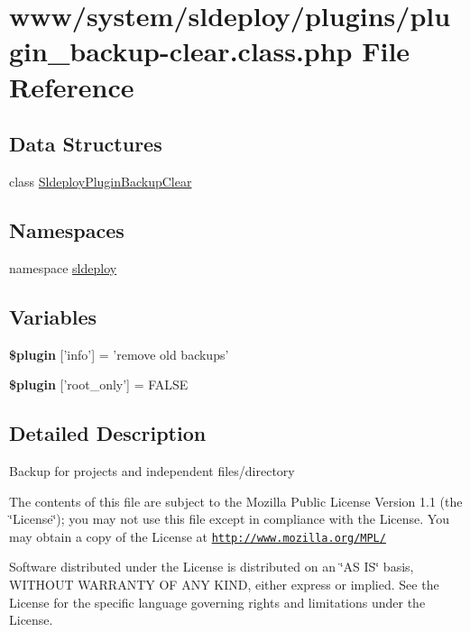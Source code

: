 \hypertarget{plugin__backup-clear_8class_8php}{
\section{www/system/sldeploy/plugins/plugin\_\-backup-\/clear.class.php File Reference}
\label{plugin__backup-clear_8class_8php}
}
\subsection*{Data Structures}
\begin{DoxyCompactItemize}
\item 
class \hyperlink{class_sldeploy_plugin_backup_clear}{SldeployPluginBackupClear}
\end{DoxyCompactItemize}
\subsection*{Namespaces}
\begin{DoxyCompactItemize}
\item 
namespace \hyperlink{namespacesldeploy}{sldeploy}
\end{DoxyCompactItemize}
\subsection*{Variables}
\begin{DoxyCompactItemize}
\item 
\hypertarget{plugin__backup-clear_8class_8php_a95edf69ebbeaeedb03bab3bb010f2af9}{
{\bfseries \$plugin} \mbox{[}'info'\mbox{]} = 'remove old backups'}
\label{plugin__backup-clear_8class_8php_a95edf69ebbeaeedb03bab3bb010f2af9}

\item 
\hypertarget{plugin__backup-clear_8class_8php_a1d302084fa15e3efe6c843cbb5096985}{
{\bfseries \$plugin} \mbox{[}'root\_\-only'\mbox{]} = FALSE}
\label{plugin__backup-clear_8class_8php_a1d302084fa15e3efe6c843cbb5096985}

\end{DoxyCompactItemize}


\subsection{Detailed Description}
Backup for projects and independent files/directory

The contents of this file are subject to the Mozilla Public License Version 1.1 (the \char`\"{}License\char`\"{}); you may not use this file except in compliance with the License. You may obtain a copy of the License at \href{http://www.mozilla.org/MPL/}{\tt http://www.mozilla.org/MPL/}

Software distributed under the License is distributed on an \char`\"{}AS IS\char`\"{} basis, WITHOUT WARRANTY OF ANY KIND, either express or implied. See the License for the specific language governing rights and limitations under the License. 